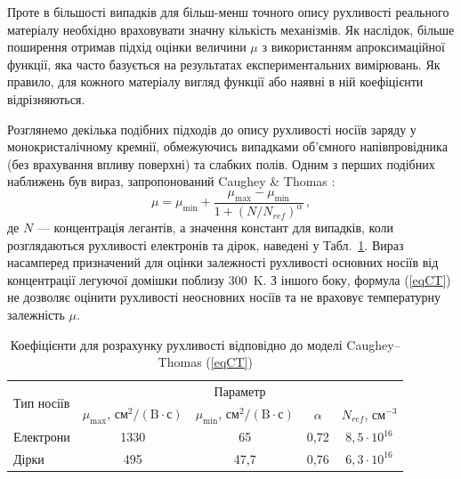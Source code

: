\documentclass[10pt,a5paper,titlepage,oneside]{book}
\numberwithin{equation}{part}
\begin{document}
Проте в більшості випадків для більш-менш точного опису рухливості реального матеріалу необхідно враховувати значну кількість механізмів.
Як наслідок, більше поширення отримав підхід оцінки величини $\mu$ з використанням апроксимаційної функції, яка часто базується на результатах експериментальних вимірювань.
Як правило, для кожного матеріалу вигляд функції або наявні в ній коефіцієнти відрізняються.

Розглянемо декілька подібних підходів до опису рухливості носіїв заряду у монокристалічному кремнії, обмежуючись випадками об'ємного напівпровідника
(без врахування впливу поверхні) та слабких полів.
Одним з перших подібних наближень був вираз, запропонований   Caughey \& Thomas \cite{Caughey1967}:
\begin{equation}\label{eqCT}
  \mu=\mu_\mathrm{min}+\frac{\mu_\mathrm{max}-\mu_\mathrm{min}}{1+(N/N_{ref})^\alpha}\,,
\end{equation}
де
$N$ --- концентрація легантів,
а значення констант для випадків, коли розглядаються рухливості електронів та дірок, наведені у Табл.~\ref{tblCT}.
Вираз насамперед призначений для оцінки залежності рухливості основних носіїв від концентрації легуючої домішки поблизу 300~K.
З іншого боку, формула (\ref{eqCT}) не дозволяє оцінити рухливості неосновних носіїв та не враховує температурну залежність $\mu$.


\begin{table}
\caption{Коефіцієнти для розрахунку рухливості відповідно до моделі Caughey--Thomas (\ref{eqCT})}
\label{tblCT}
\centering
\begin{tabular}{|l|c|c|c|c|}
\hline
\multirow{2}{*}{Тип носіїв} & \multicolumn{4}{c|}{Параметр} \\
\cline{2-5}
&$\mu_\mathrm{max}$, $\text{см}^2/(\text{B}\cdot\text{с})$&$\mu_\mathrm{min}$, $\text{см}^2/(\text{B}\cdot\text{с})$&$\alpha$&$N_{ref}$, см$^{-3}$ \rule{0pt}{13pt}\\
\hline
Електрони&1330&65&0,72&$8,5\cdot10^{16}$\\
Дірки&495&47,7&0,76&$6,3\cdot10^{16}$\\
\hline
\end{tabular}
\end{table}
\end{document}
